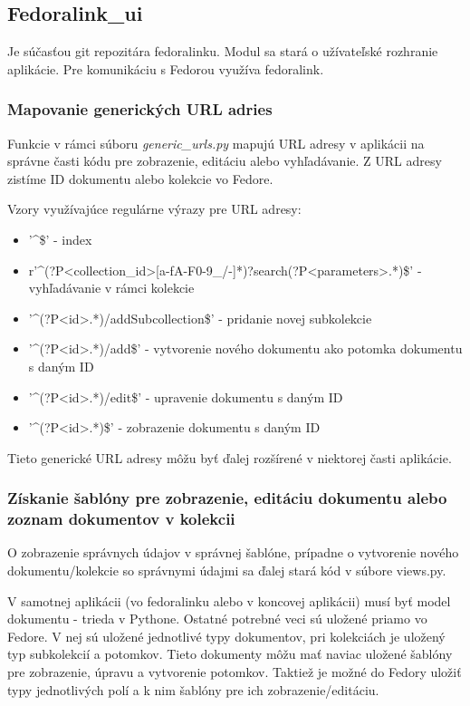 \documentclass[thesis=M,slovak]{FITthesis}[2013/05/06]
\begin{document}
\subsection{Fedoralink\_ui}
Je súčasťou git repozitára fedoralinku. Modul sa stará o užívateľské rozhranie aplikácie. Pre komunikáciu s Fedorou využíva fedoralink.

\subsubsection{Mapovanie generických URL adries}
Funkcie v rámci súboru {\em generic\_urls.py} mapujú URL adresy v aplikácii na správne časti kódu pre zobrazenie, editáciu alebo vyhľadávanie. Z URL adresy zistíme ID dokumentu alebo kolekcie vo Fedore.

Vzory využívajúce regulárne výrazy pre URL adresy:
\begin{itemize}
	\item '\textasciicircum\$' - index
	\item r'\textasciicircum(?P<collection\_id>[a-fA-F0-9\_/-]*)?search(?P<parameters>.*)\$' - vyhľadávanie v rámci kolekcie
	\item '\textasciicircum(?P<id>.*)/addSubcollection\$' - pridanie novej subkolekcie
	\item '\textasciicircum(?P<id>.*)/add\$' - vytvorenie nového dokumentu ako potomka dokumentu s daným ID
	\item '\textasciicircum(?P<id>.*)/edit\$' - upravenie dokumentu s daným ID
	\item '\textasciicircum(?P<id>.*)\$' - zobrazenie dokumentu s daným ID
\end{itemize}

Tieto generické URL adresy môžu byť ďalej rozšírené v niektorej časti aplikácie.

\subsubsection{Získanie šablóny pre zobrazenie, editáciu dokumentu alebo zoznam dokumentov v kolekcii}
O zobrazenie správnych údajov v správnej šablóne, prípadne o vytvorenie nového dokumentu/kolekcie so správnymi údajmi sa ďalej stará kód v súbore views.py.

V samotnej aplikácii (vo fedoralinku alebo v koncovej aplikácii) musí byť model dokumentu - trieda v Pythone. Ostatné potrebné veci sú uložené priamo vo Fedore. V nej sú uložené jednotlivé typy dokumentov, pri kolekciách je uložený typ subkolekcií a potomkov. Tieto dokumenty môžu mať naviac uložené šablóny pre zobrazenie, úpravu a vytvorenie potomkov. Taktiež je možné do Fedory uložiť typy jednotlivých polí a k nim šablóny pre ich zobrazenie/editáciu.
\end{document}
